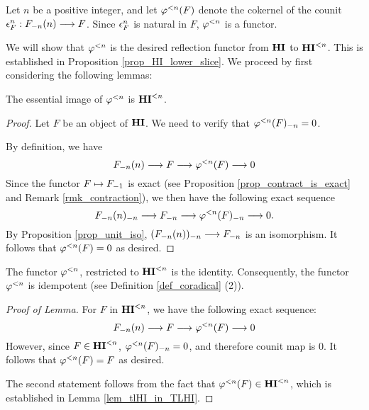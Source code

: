 \begin{defn}
Let $n$ be a positive integer, and let $\tlHI{n}(F)$ denote the 
cokernel of the counit $\cuHI^n_F: \LHI[n]{\RHI[n]{F}} \to F$. 
Since $\cuHI^n_F$ is natural in $F$, $\tlHI{n}$ is a functor.
\end{defn}

We will show that $\tlHI{n}$ is the desired reflection functor
from $\HI$ to $\TLHI{n}{\HI}$. This is established in Proposition
\ref{prop_HI_lower_slice}. We proceed by first considering the
following lemmas:

\begin{lem}\label{lem_tlHI_in_TLHI}
The essential image of $\tlHI{n}$ is $\TLHI{n}{\HI}$.
\end{lem}

\begin{proof}
Let $F$ be an object of $\HI$. We need to verify that 
$\RHI[n]{\tlHI{n}(F)} = 0$.

By definition, we have
\[
\LHI[n]{\RHI[n]{F}} \to F \to \tlHI{n}(F) \to 0
\]
Since the functor $F \mapsto \RHI{F}$ is exact (see Proposition
\ref{prop_contract_is_exact} and Remark \ref{rmk_contraction}), we 
then have the following exact sequence
\[
\RHI[n]{\LHI[n]{\RHI[n]{F}}} \to \RHI[n]{F} \to
\RHI[n]{\tlHI{n}(F)} \to 0.
\]
By Proposition \ref{prop_unit_iso}, $\RHI[n]{(\LHI[n]{\RHI[n]{F}})}
\to \RHI[n]{F}$ is an isomorphism. It follows that $\tlHI{n}(F) = 
0$ as desired.
\end{proof}

\begin{lem}\label{lem_tlHI_id}
The functor $\tlHI{n}$, restricted to $\TLHI{n}{\HI}$ is the 
identity. Consequently, the functor $\tlHI{n}$ is idempotent
(see Definition \ref{def_coradical} (2)).
\end{lem}
\begin{proof}[Proof of Lemma]
For $F$ in $\TLHI{n}{\HI}$, we have the following exact sequence:
\[
\LHI[n]{\RHI[n]{F}} \to F \to \tlHI{n}(F) \to 0
\]
However, since $F \in \TLHI{n}{\HI}$, $\RHI[n]{\tlHI{n}(F)} = 0$, 
and therefore counit map is $0$. It follows that $\tlHI{n}(F) = F$ 
as desired.

The second statement follows from the fact that $\tlHI{n}(F) \in 
\TLHI{n}{\HI}$, which is established in Lemma 
\ref{lem_tlHI_in_TLHI}.
\end{proof}

